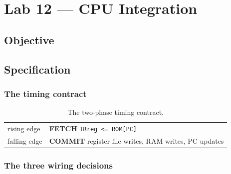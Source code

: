 
\chapter{Lab 12 --- CPU Integration}

\section{Objective}

\section{Specification}

\subsection*{The timing contract}

\begin{table}[htbp]
\centering
\caption{The two-phase timing contract.}
\label{tab:lab12-timing}
\begin{tabular}{ll}
\toprule
rising edge & \textbf{FETCH} \quad \texttt{IRreg <= ROM[PC]} \\
falling edge & \textbf{COMMIT} \quad register file writes, RAM writes, PC updates \\
\bottomrule
\end{tabular}
\end{table}


\subsection*{The three wiring decisions}

